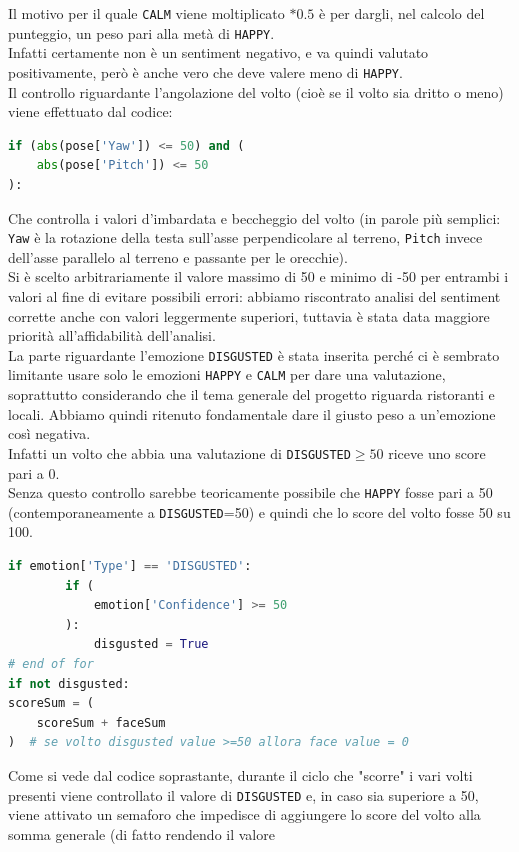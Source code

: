 Il motivo per il quale \verb+CALM+ viene moltiplicato $*0.5$ è per dargli, nel calcolo del punteggio, un
peso pari alla metà di \verb+HAPPY+.\\
Infatti certamente non è un sentiment negativo, e va quindi
valutato positivamente, però è anche vero che deve valere meno di \verb+HAPPY+.\\
Il controllo riguardante l'angolazione del volto (cioè se il volto sia dritto o meno) viene
effettuato dal codice:
\begin{lstlisting}[language=Python]
if (abs(pose['Yaw']) <= 50) and (
    abs(pose['Pitch']) <= 50
):
\end{lstlisting}
Che controlla i valori d'imbardata e beccheggio del volto (in parole più semplici: \verb+Yaw+ è 
la rotazione della testa sull'asse perpendicolare al terreno, \verb+Pitch+ invece dell'asse parallelo al 
terreno e passante per le orecchie). \\
Si è scelto arbitrariamente il valore massimo di 50 e minimo 
di -50 per entrambi i valori al fine di evitare possibili errori: abbiamo riscontrato analisi del 
sentiment corrette anche con valori leggermente superiori, tuttavia è stata data maggiore priorità
all'affidabilità dell'analisi. \\
La parte riguardante l'emozione \verb+DISGUSTED+ è stata inserita perché ci è sembrato limitante usare
solo le emozioni \verb+HAPPY+ e \verb+CALM+ per dare una valutazione, soprattutto considerando che il tema
generale del progetto riguarda ristoranti e locali. Abbiamo quindi ritenuto
fondamentale dare il giusto peso a un'emozione così negativa. \\
Infatti un volto che abbia una
valutazione di \verb+DISGUSTED+$\geq50$ riceve uno score pari a 0. \\
Senza questo controllo sarebbe teoricamente
possibile che \verb+HAPPY+ fosse pari a 50 (contemporaneamente a \verb+DISGUSTED+=50) e quindi che lo score 
del volto fosse 50 su 100.
\begin{lstlisting}[language=Python]
    if emotion['Type'] == 'DISGUSTED':
        if (
            emotion['Confidence'] >= 50
        ): 
            disgusted = True
# end of for
if not disgusted:
scoreSum = (
    scoreSum + faceSum
)  # se volto disgusted value >=50 allora face value = 0
\end{lstlisting}
Come si vede dal codice soprastante, durante il ciclo che "scorre" i vari volti presenti viene
controllato il valore di \verb+DISGUSTED+ e, in caso sia superiore a 50, viene attivato un semaforo 
che impedisce di aggiungere lo score del volto alla somma generale (di fatto rendendo il valore
